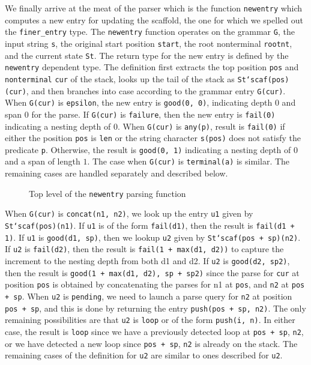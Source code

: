 \documentclass[sigplan,10pt,anonymous,review]{acmart}\settopmatter{printfolios=true,printccs=false,printacmref=false}
\begin{document}
\begin{CCSXML}
We finally arrive at the meat of the parser which is the function \texttt{newentry} which computes a new entry for updating the scaffold, the one for which we
spelled out the \texttt{finer\_entry} type.  The \texttt{newentry} function operates on the grammar \texttt{G}, the input string \texttt{s}, the original start position \texttt{start}, the root nonterminal \texttt{rootnt}, and the current
state \texttt{St}\@.  The return type for the new entry is defined
by the \texttt{newentry} dependent type.   The definition first
extracts the top position \texttt{pos} and \texttt{nonterminal} \texttt{cur}
of the stack, looks up the tail of the stack as \texttt{St`scaf(pos)(cur)},
and then branches into case according to the grammar entry \texttt{G(cur)}\@.
When \texttt{G(cur)} is \texttt{epsilon}, the new entry is \texttt{good(0, 0)},
indicating depth $0$ and span $0$ for the parse.  If \texttt{G(cur)} is \texttt{failure}, then the new entry is \texttt{fail(0)} indicating a nesting depth of $0$\@.
When \texttt{G(cur)} is \texttt{any(p)}, result is
\texttt{fail(0)} if either the position \texttt{pos} is \texttt{len}
  or the string character \texttt{s(pos)} does not satisfy the predicate \texttt{p}\@.  Otherwise, the result is \texttt{good(0, 1)} indicating a nesting depth of $0$ and a span of length $1$\@.  
The case when \texttt{G(cur)} is \texttt{terminal(a)} is similar.
The remaining cases are handled separately and described below. 

\begin{figure}[h!]
  
    \vspace*{-4mm}
\caption{Top level of the \texttt{newentry} parsing function}
\label{pvs:newentrytop}
\end{figure}


When \texttt{G(cur)} is \texttt{concat(n1, n2)}, we look up the entry \texttt{u1}
given by \texttt{St`scaf(pos)(n1)}\@.   If \texttt{u1} is of the form \texttt{fail(d1)}, then
the result is \texttt{fail(d1 + 1)}\@.  If \texttt{u1} is \texttt{good(d1, sp)}, then
we lookup \texttt{u2} given by \texttt{St`scaf(pos + sp)(n2)}\@.  If
\texttt{u2} is \texttt{fail(d2)}, then the result is \texttt{fail(1 + max(d1, d2))} to capture the increment to the nesting depth from both d1 and d2.
If \texttt{u2} is \texttt{good(d2, sp2)}, then the result is
\texttt{good(1 + max(d1, d2), sp + sp2)} since the parse for \texttt{cur} at position \texttt{pos} is obtained by concatenating the parses for n1 at \texttt{pos}, and
\texttt{n2} at \texttt{pos + sp}\@.  When \texttt{u2} is \texttt{pending},
we need to launch a parse query for \texttt{n2} at position \texttt{pos + sp},
and this is done by returning the entry \texttt{push(pos + sp, n2)}\@.
The only remaining possibilities are that \texttt{u2} is \texttt{loop} or
of the form \texttt{push(i, n)}\@.  In either case, the result is \texttt{loop}
since we have a previously detected loop at \texttt{pos + sp}, \texttt{n2},
or we have detected a new loop since \texttt{pos + sp}, \texttt{n2} is already
on the stack.  The remaining cases of the definition for \texttt{u2}
are similar to ones described for \texttt{u2}\@.  


\end{CCSXML}
\end{document}

